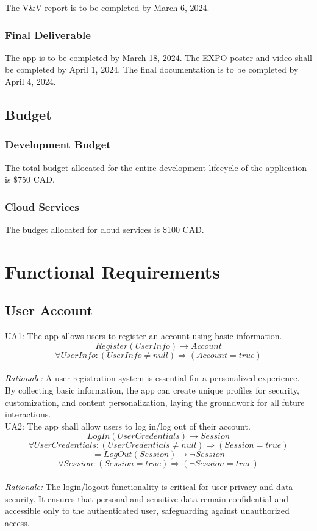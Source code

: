 \documentclass[12pt]{article}
\begin{document}
The V\&V report is to be completed by March 6, 2024.

\subsubsection{Final Deliverable}

The app is to be completed by March 18, 2024. The EXPO poster and video shall be completed by April 1, 2024. The final documentation is to be completed by April 4, 2024. 

\subsection{Budget}

\subsubsection{Development Budget}

The total budget allocated for the entire development lifecycle of the application is \$750 CAD.

\subsubsection{Cloud Services}

The budget allocated for cloud services is \$100 CAD.

\section{Functional Requirements}

\subsection{User Account}

\parindent UA1: The app allows users to register an account using basic information.
\[Register(UserInfo) \rightarrow Account \]
\[ \forall UserInfo: (UserInfo \neq null) \Rightarrow (Account = true) \]\\
\textit{Rationale:} A user registration system is essential for a personalized experience. By collecting basic information, the app can create unique profiles for security, customization, and content personalization, laying the groundwork for all future interactions.
\\

UA2: The app shall allow users to log in/log out of their account.
\[LogIn(UserCredentials) \rightarrow Session \]
\[ \forall UserCredentials: (UserCredentials \neq null) \Rightarrow (Session = true) \]
\[=LogOut(Session) \rightarrow \neg Session \]
\[ \forall Session: (Session = true) \Rightarrow (\neg Session = true) \]\\
\textit{Rationale:} The login/logout functionality is critical for user privacy and data security. It ensures that personal and sensitive data remain confidential and accessible only to the authenticated user, safeguarding against unauthorized access.
\\
\end{document}
